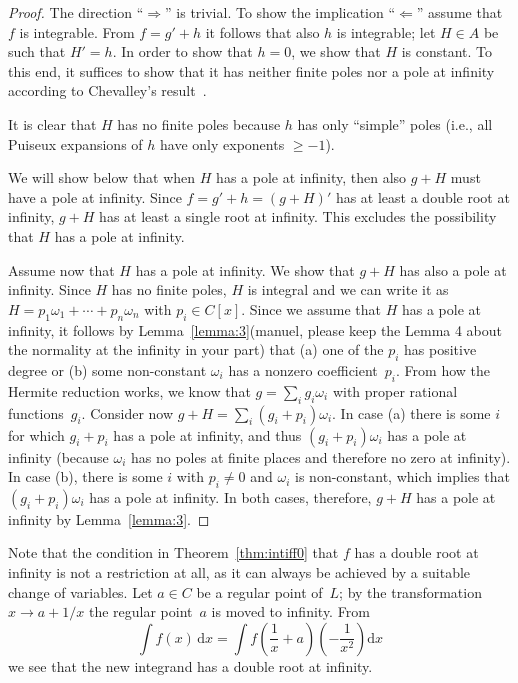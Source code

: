 \documentclass{sig-alternate}
\newcommand{\red}{\color{red}}
\begin{document}
\begin{proof}
The direction ``$\Rightarrow$'' is trivial. To show the implication
``$\Leftarrow$'' assume that $f$ is integrable. From $f=g'+h$ it follows that
also $h$ is integrable; let $H\in A$ be such that $H'=h$.  In order to show
that $h=0$, we show that $H$ is constant.  To this end, it suffices to show that
it has neither finite poles nor a pole at infinity according to Chevalley's result~\cite[page 9, Corollary 3 ]{Chevalley1951}.

It is clear that $H$ has no finite poles because $h$ has only ``simple'' poles (i.e., all Puiseux
expansions of $h$ have only exponents $\geq-1$).

We will show below that when $H$ has a pole at infinity, then also $g+H$ must
have a pole at infinity.  Since $f=g'+h=(g+H)'$ has at least a double root at
infinity, $g+H$ has at least a single root at infinity. This excludes the
possibility that $H$ has a pole at infinity.

Assume now that $H$ has a pole at infinity. We show that $g+H$ has also a pole at infinity.
Since $H$ has no finite poles, $H$ is integral and we can write it as
$H=p_1\omega_1+\cdots+p_n\omega_n$ with $p_i\in C[x]$.
Since we assume that $H$ has a pole at infinity, it follows by Lemma~\ref{lemma:3}{\red (manuel, please keep the
Lemma 4 about the normality at the infinity in your part)} that
(a) one of the $p_i$ has positive degree or
(b) some non-constant $\omega_i$ has a nonzero coefficient~$p_i$.
From how the Hermite reduction works, we know that $g=\sum_i g_i\omega_i$
with proper rational functions~$g_i$. Consider now $g+H=\sum_i (g_i+p_i)\omega_i$.
In case (a) there is some $i$ for which $g_i+p_i$ has a pole at infinity,
and thus $(g_i+p_i)\omega_i$ has a pole at infinity (because $\omega_i$ has
no poles at finite places and therefore no zero at infinity).
In case (b), there is some $i$ with $p_i\neq0$ and $\omega_i$ is non-constant,
which implies that $(g_i+p_i)\omega_i$ has a pole at infinity.
In both cases, therefore, $g+H$ has a pole at infinity by Lemma~\ref{lemma:3}.
\end{proof}

Note that the condition in Theorem~\ref{thm:intiff0} that $f$ has a double
root at infinity is not a restriction at all, as it can always be achieved by
a suitable change of variables. Let $a\in C$ be a regular point of~$L$; by
the transformation $x\to a+1/x$ the regular point~$a$ is moved to
infinity. From
\[
  \int f(x) \,\mathrm{d}x = \int f\left(\frac{1}{x}+a\right)\left(-\frac{1}{x^2}\right) \mathrm{d}x
\]
we see that the new integrand has a double root at infinity.
\end{document}
